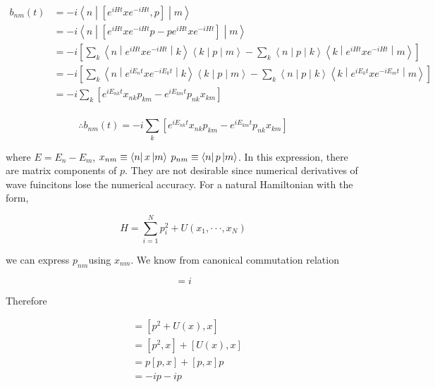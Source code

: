 \documentclass[12pt]{report}
\newcommand*{\1}{\hspace{1pt}}
\begin{document}
        \begin{align*}
            b_{nm}(t) &= -i\left\langle n \middle|\left[e^{iHt}xe^{-iHt},p\right]\middle| m\right\rangle \\
            &= -i\left\langle n \middle|\left[e^{iHt}xe^{-iHt}p - pe^{iHt}xe^{-iHt}\right]\middle| m\right\rangle \\
            &= -i\left[\sum_{k}\left\langle n \middle|e^{iHt}xe^{-iHt} \middle| k\right\rangle\left\langle k \middle| p \middle| m \right\rangle - \sum_{k}\left\langle n \middle| p \middle| k \right\rangle\left\langle k \middle|e^{iHt}xe^{-iHt} \middle | m\right\rangle\right] \\
            &= -i\left[\sum_{k}\left\langle n \middle|e^{iE_{n}t}xe^{-iE_{k}t} \middle| k\right\rangle\left\langle k \middle| p \middle| m \right\rangle - \sum_{k}\left\langle n \middle| p \middle| k \right\rangle\left\langle k \middle|e^{iE_{k}t}xe^{-iE_{m}t} \middle | m\right\rangle\right] \\
            &= -i \sum_{k}\left[e^{iE_{nk}t}x_{nk}p_{km} - e^{iE_{km}t}p_{nk}x_{km} \right] \\
        \end{align*}

        \begin{equation}
            \therefore b_{nm}(t) = -i \sum_{k}\left[e^{iE_{nk}t}x_{nk}p_{km} - e^{iE_{km}t}p_{nk}x_{km} \right]
        \end{equation}

        where $E = E_{n} - E_{m}$, $x_{nm} \equiv \bra{n}x\ket{m}$ $p_{nm} \equiv \bra{n}p\ket{m}$. In this expression, there are matrix components of $p$. They are not desirable since
        numerical derivatives of wave fuincitons lose the numerical accuracy. For a natural Hamiltonian with the form, 

        \begin{equation}
            H = \sum_{i=1} ^{N} p_{i}^{2} + U(x_{1}, \cdot \cdot \cdot ,  x_{N})
        \end{equation}

        we can express $p_{nm}$using $x_{nm}$. We know from canonical commutation relation 

        \begin{equation}
            [x,p] = i \tag{$\hbar=1$}
        \end{equation}

        Therefore

        \begin{align*}
            [H,x] &= [p^{2} + U(x) , x] \\
            &= [p^{2},x] + [U(x), x] \\
            &= p[p,x] + [p,x]p  \\
            &= -ip -ip  \\
        \end{align*}
\end{document}
